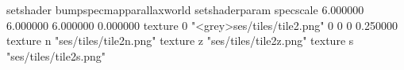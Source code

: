 setshader bumpspecmapparallaxworld
setshaderparam specscale 6.000000 6.000000 6.000000 0.000000
texture 0 "<grey>ses/tiles/tile2.png" 0 0 0 0.250000
texture n "ses/tiles/tile2n.png"
texture z "ses/tiles/tile2z.png"
texture s "ses/tiles/tile2s.png"

